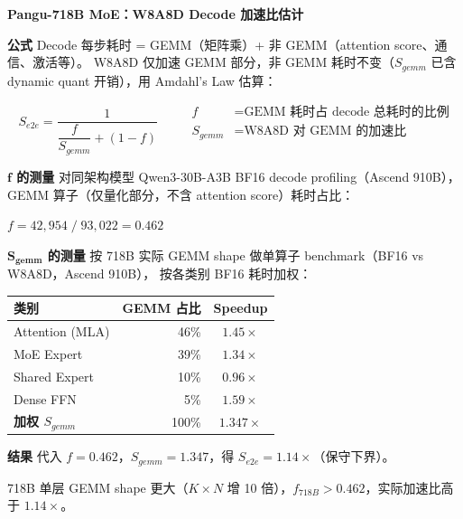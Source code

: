 \documentclass[12pt,a4paper]{ctexart}
\begin{document}
\begin{center}
{\LARGE\bfseries Pangu-718B MoE：W8A8D Decode 加速比估计}
\end{center}

\vspace{0.8em}

\noindent
{}

\vspace{1.2em}

\noindent\textbf{公式}\quad
Decode 每步耗时 = GEMM（矩阵乘）+ 非 GEMM（attention score、通信、激活等）。
W8A8D 仅加速 GEMM 部分，非 GEMM 耗时不变（$S_{gemm}$ 已含 dynamic quant 开销），用 Amdahl's Law 估算：

\vspace{0.3em}
\[
\boxed{\;S_{e2e}=\frac{1}{\dfrac{f}{S_{gemm}}+(1-f)}\;}
\qquad
\begin{aligned}
f &= \text{GEMM 耗时占 decode 总耗时的比例}\\
S_{gemm} &= \text{W8A8D 对 GEMM 的加速比}
\end{aligned}
\]

\vspace{0.8em}

\noindent\textbf{$\bm{f}$ 的测量}\quad
对同架构模型 Qwen3-30B-A3B BF16 decode profiling（Ascend 910B），
GEMM 算子（仅量化部分，不含 attention score）耗时占比：

\vspace{0.3em}
\centerline{$f = 42{,}954 \;/\; 93{,}022 = \mathbf{0.462}$}

\vspace{0.8em}

\noindent\textbf{$\bm{S_{gemm}}$ 的测量}\quad
按 718B 实际 GEMM shape 做单算子 benchmark（BF16 vs W8A8D，Ascend 910B），
按各类别 BF16 耗时加权：

\vspace{0.3em}
\begin{center}
\begin{tabular}{lrc}
\toprule
类别 & GEMM 占比 & Speedup \\
\midrule
Attention (MLA) & 46\% & $1.45\times$ \\
MoE Expert & 39\% & $1.34\times$ \\
Shared Expert & 10\% & $0.96\times$ \\
Dense FFN & 5\% & $1.59\times$ \\
\midrule
\textbf{加权 $S_{gemm}$} & 100\% & $\mathbf{1.347\times}$ \\
\bottomrule
\end{tabular}
\end{center}

\vspace{0.8em}

\noindent\textbf{结果}\quad
代入 $f\!=\!0.462$，$S_{gemm}\!=\!1.347$，得 $S_{e2e} = \mathbf{1.14\times}$（保守下界）。

\vspace{0.3em}
{\small 718B 单层 GEMM shape 更大（$K\!\times\!N$ 增 10 倍），$f_{718B} > 0.462$，实际加速比高于 $1.14\times$。}
\end{document}
